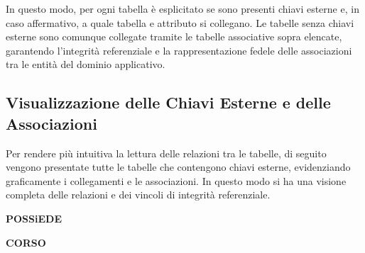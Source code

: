 In questo modo, per ogni tabella è esplicitato se sono presenti chiavi esterne e, in caso affermativo, a quale tabella e attributo si collegano. Le tabelle senza chiavi esterne sono comunque collegate tramite le tabelle associative sopra elencate, garantendo l'integrità referenziale e la rappresentazione fedele delle associazioni tra le entità del dominio applicativo.

\subsection{Visualizzazione delle Chiavi Esterne e delle Associazioni}
Per rendere più intuitiva la lettura delle relazioni tra le tabelle, di seguito vengono presentate tutte le tabelle che contengono chiavi esterne, evidenziando graficamente i collegamenti e le associazioni. In questo modo si ha una visione completa delle relazioni e dei vincoli di integrità referenziale.

\vspace{0.5em}
\noindent


\textbf{\large POSSiEDE}

\noindent
{}

\vspace{0.8em}


\textbf{\large CORSO}

\noindent
{}

